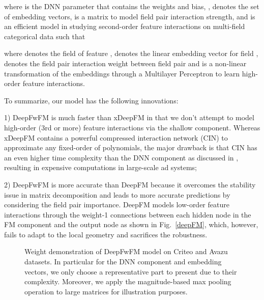 \documentclass[sigconf]{acmart}
\begin{document}
where  is the DNN parameter that contains the weights and bias, ,  denotes the set of embedding vectors,  is a matrix to model field pair interaction strength, and  is an efficient model\citep{fwfm} in studying second-order feature interactions on multi-field categorical data such that

where  denotes the field of feature ,  denotes the linear embedding vector for field ,  denotes the field pair interaction weight between field pair  and  is a non-linear transformation of the embeddings through a Multilayer Perceptron to learn high-order feature interactions.

To summarize, our model has the following innovations:
 

1) DeepFwFM is much faster than xDeepFM in that we don't attempt to model high-order (3rd or more) feature interactions via the shallow component. Whereas xDeepFM contains a powerful compressed interaction network (CIN) to approximate any fixed-order of polynomials, the major drawback is that CIN has an even higher time complexity than the DNN component as discussed in \cite{xdeepfm}, resulting in expensive computations in large-scale ad systems;

2) DeepFwFM is more accurate than DeepFM because it overcomes the stability issue in matrix decomposition and leads to more accurate predictions \citep{ffm, fwfm} by considering the field pair importance. DeepFM models low-order feature interactions through the weight-1 connections between each hidden node in the FM component and the output node as shown in Fig.~\ref{deepFM}, which, however, fails to adapt to the local geometry and sacrifices the robustness.


\begin{figure*}[h!]
\centering
  \qquad\qquad
  \qquad\qquad
  \qquad\qquad
  \qquad\qquad
  \caption{Weight demonstration of DeepFwFM model on Criteo and Avazu datasets. In particular for the DNN component and embedding vectors, we only choose a representative part to present due to their complexity. Moreover, we apply the magnitude-based max pooling operation to large matrices for illustration purposes.}
  \label{sparse_r}
  \vspace{1em}
\end{figure*}
\end{document}

